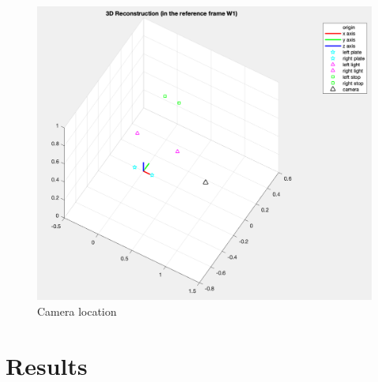 \documentclass{article}
\begin{document}
\begin{figure}[hbt!]
\centering
\includegraphics[scale=0.3]{images/cameralocation.png}
\caption{Camera location}
\label{fig:cameralocation}
\end{figure}

\newpage
\section{Results}




\end{document}
